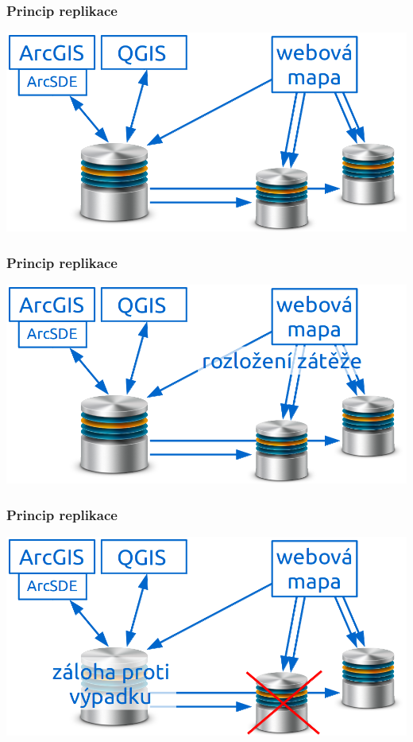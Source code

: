 \documentclass[xcolor=dvipsnames, 14pt]{beamer}
\begin{document}
  \begin{frame}
    \frametitle{Princip replikace}
    \centering
    \includegraphics[scale=0.45]{obr/schema11.png} 
  \end{frame}

  \begin{frame}
    \frametitle{Princip replikace}
    \centering
    \includegraphics[scale=0.45]{obr/schema12.png} 
  \end{frame}

  \begin{frame}
    \frametitle{Princip replikace}
    \centering
    \includegraphics[scale=0.45]{obr/schema13.png} 
  \end{frame}
\end{document}
